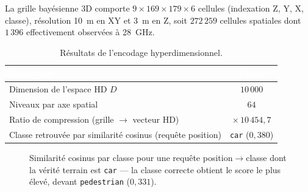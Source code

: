 \documentclass[12pt,a4paper,titlepage]{article}
\newcommand{\hd}[1]{\textcolor{white}{\textbf{#1}}}
\begin{document}
La grille bayésienne 3D comporte $9 \times 169 \times 179 \times 6$ cellules (indexation Z, Y, X, classe), résolution 10~m en XY et 3~m en Z, soit $272\,259$ cellules spatiales dont $1\,396$ effectivement observées à 28~GHz.

\begin{table}[H]
    \centering
    \caption{Résultats de l'encodage hyperdimensionnel.}
    \begin{tabular}{lc}
        \toprule
        \rowcolor{tabhead}
        \hd{Indicateur} & \hd{Valeur} \\
        \midrule
        Dimension de l'espace HD $D$ & $10\,000$ \\
        Niveaux par axe spatial & $64$ \\
        Ratio de compression (grille $\to$ vecteur HD) & $\times\,10\,454{,}7$ \\
        Classe retrouvée par similarité cosinus (requête position) & \texttt{car} ($0{,}380$) \\
        \bottomrule
    \end{tabular}
\end{table}

\begin{figure}[H]
    \centering
    \caption{Similarité cosinus par classe pour une requête position$\to$classe dont la vérité terrain est \texttt{car} --- la classe correcte obtient le score le plus élevé, devant \texttt{pedestrian} ($0{,}331$).}
    \label{fig:chart_hd_query}
\end{figure}
\end{document}
